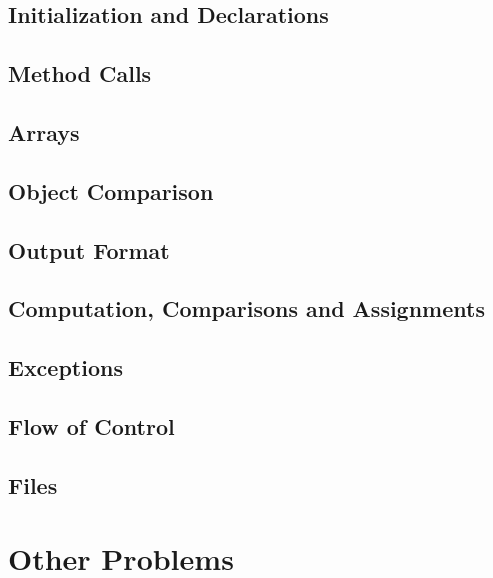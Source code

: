 \subsection{Initialization and Declarations}
	


\subsection{Method Calls}
	


\subsection{Arrays}
	


\subsection{Object Comparison}
	


\subsection{Output Format}
	


\subsection{Computation, Comparisons and Assignments}
	


\subsection{Exceptions}
	


\subsection{Flow of Control}
	


\subsection{Files}
	



\section{Other Problems}
\blindtext